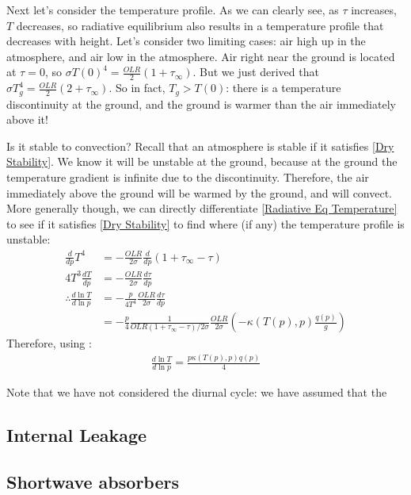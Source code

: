Next let's consider the temperature profile. As we can clearly see, as $\tau$ increases, $T$ decreases, so radiative equilibrium also results in a temperature profile that decreases with height. Let's consider two limiting cases: air high up in the atmosphere, and air low in the atmosphere. Air right near the ground is located at $\tau=0$, so $\sigma T(0)^4=\frac{OLR}{2}(1+\tau_\infty)$. But we just derived that $\sigma T_g^4=\frac{OLR}{2}(2+\tau_\infty)$. So in fact, $T_g>T(0)$: there is a temperature discontinuity at the ground, and the ground is warmer than the air immediately above it! 

Is it stable to convection? Recall that an atmosphere is stable if it satisfies \ref{Dry Stability}. We know it will be unstable at the ground, because at the ground the temperature gradient is infinite due to the discontinuity. Therefore, the air immediately above the ground will be warmed by the ground, and will convect. More generally though, we can directly differentiate \ref{Radiative Eq Temperature} to see if it satisfies \ref{Dry Stability} to find where (if any) the temperature profile is unstable:
\begin{align*}
    \frac{d}{dp}T^4&=-\frac{OLR}{2\sigma}\frac{d}{dp}(1+\tau_\infty-\tau)\\
    4T^3\frac{dT}{dp}&=-\frac{OLR}{2\sigma}\frac{d\tau}{dp}\\
    \therefore
    \frac{d\ln T}{d\ln p}&=-\frac{p}{4T^4}\frac{OLR}{2\sigma}\frac{d\tau}{dp}\\
    &=-\frac{p}{4}\frac{1}{OLR(1+\tau_\infty-\tau)/2\sigma}\frac{OLR}{2\sigma}
    \left( -\kappa(T(p),p) \frac{q(p)}{g} \right)
\end{align*}
Therefore, using :
\begin{align}
    \frac{d\ln T}{d\ln p} = \frac{p\kappa(T(p),p)q(p)}{4}
\end{align}

Note that we have not considered the diurnal cycle: we have assumed that the 

\subsection{Internal Leakage}

\subsection{Shortwave absorbers}\label{Shortwave}
